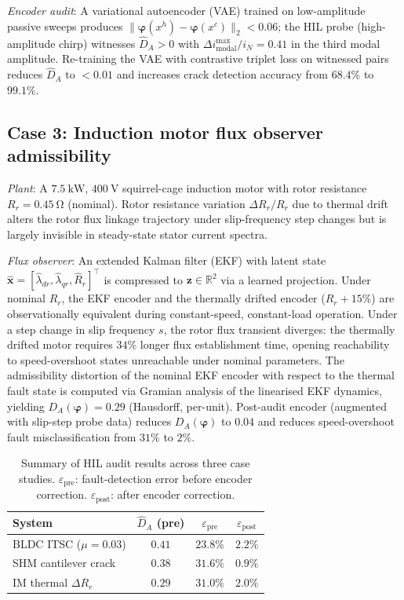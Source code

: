 \documentclass[10pt,twocolumn]{article}
\theoremstyle{plain}
\theoremstyle{definition}
\theoremstyle{remark}
\newcommand{\DA}{D_{A}(\bm{\varphi})}
\newcommand{\bvphi}{\bm{\varphi}}
\newcommand{\R}{\mathbb{R}}
\begin{document}
\textit{Encoder audit}: A variational autoencoder (VAE) trained on
low-amplitude passive sweeps produces $\|\bvphi(x^h)-\bvphi(x^c)\|_2 < 0.06$;
the HIL probe (high-amplitude chirp) witnesses $\hat{D}_A > 0$ with
$\Delta i_{\text{modal}}^{\max}/i_N = 0.41$ in the third modal amplitude.
Re-training the VAE with contrastive triplet loss on witnessed pairs
reduces $\hat{D}_A$ to $< 0.01$ and increases crack detection accuracy from
$68.4\%$ to $99.1\%$.

\subsection{Case 3: Induction motor flux observer admissibility}

\textit{Plant}: A $\SI{7.5}{\kilo\watt}$, $\SI{400}{\volt}$ squirrel-cage
induction motor with rotor resistance $R_r = \SI{0.45}{\ohm}$ (nominal).
Rotor resistance variation $\Delta R_r / R_r$ due to thermal drift alters
the rotor flux linkage trajectory under slip-frequency step changes
but is largely invisible in steady-state stator current spectra.

\textit{Flux observer}: An extended Kalman filter (EKF) with latent state
$\hat{\bm{x}} = [\hat{\lambda}_{dr}, \hat{\lambda}_{qr}, \hat{R}_r]^\top$
is compressed to $\bm{z} \in \R^2$ via a learned projection. Under nominal
$R_r$, the EKF encoder and the thermally drifted encoder ($R_r + 15\%$)
are observationally equivalent during constant-speed, constant-load operation.
Under a step change in slip frequency $s$, the rotor flux transient diverges:
the thermally drifted motor requires $34$\% longer flux establishment time,
opening reachability to speed-overshoot states unreachable under nominal
parameters. The admissibility distortion of the nominal EKF encoder with
respect to the thermal fault state is computed via Gramian analysis of
the linearised EKF dynamics, yielding $\DA = 0.29$ (Hausdorff, per-unit).
Post-audit encoder (augmented with slip-step probe data) reduces $\DA$ to
$0.04$ and reduces speed-overshoot fault misclassification from $31\%$ to $2\%$.

\begin{table}[t]
\caption{Summary of HIL audit results across three case studies.
$\varepsilon_{\text{pre}}$: fault-detection error before encoder correction.
$\varepsilon_{\text{post}}$: after encoder correction.}
\label{tab:results}
\centering\small
\begin{tabular}{lccc}
\toprule
System & $\hat{D}_A$ (pre) & $\varepsilon_{\text{pre}}$ & $\varepsilon_{\text{post}}$\\
\midrule
BLDC ITSC ($\mu=0.03$) & $0.41$ & $23.8\%$ & $2.2\%$ \\
SHM cantilever crack   & $0.38$ & $31.6\%$ & $0.9\%$ \\
IM thermal $\Delta R_r$& $0.29$ & $31.0\%$ & $2.0\%$ \\
\bottomrule
\end{tabular}
\end{table}
\end{document}
